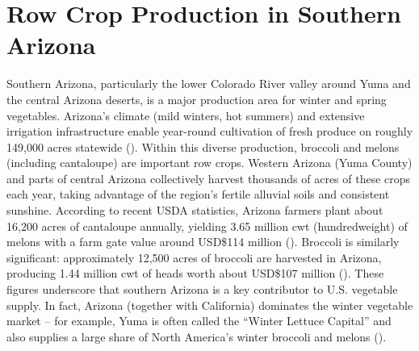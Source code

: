 \documentclass[letterpaper]{report}
\begin{document}
\section{Row Crop Production in Southern Arizona}

Southern Arizona, particularly the lower Colorado River valley around Yuma and the central Arizona deserts, is a major production area for winter and spring vegetables. Arizona’s climate (mild winters, hot summers) and extensive irrigation infrastructure enable year-round cultivation of fresh produce on roughly 149,000 acres statewide (\cite{Arizona-Department-of-Agriculture2018-dx}). Within this diverse production, broccoli and melons (including cantaloupe) are important row crops. Western Arizona (Yuma County) and parts of central Arizona collectively harvest thousands of acres of these crops each year, taking advantage of the region’s fertile alluvial soils and consistent sunshine. According to recent USDA statistics, Arizona farmers plant about 16,200 acres of cantaloupe annually, yielding 3.65 million cwt (hundredweight) of melons with a farm gate value around USD\$114 million (\cite{Arizona-Department-of-Agriculture2018-dx}). Broccoli is similarly significant: approximately 12,500 acres of broccoli are harvested in Arizona, producing 1.44 million cwt of heads worth about USD\$107 million (\cite{Arizona-Department-of-Agriculture2018-dx}). These figures underscore that southern Arizona is a key contributor to U.S. vegetable supply. In fact, Arizona (together with California) dominates the winter vegetable market – for example, Yuma is often called the “Winter Lettuce Capital” and also supplies a large share of North America’s winter broccoli and melons (\cite{Arizona-Department-of-Agriculture2018-dx}).
\end{document}
